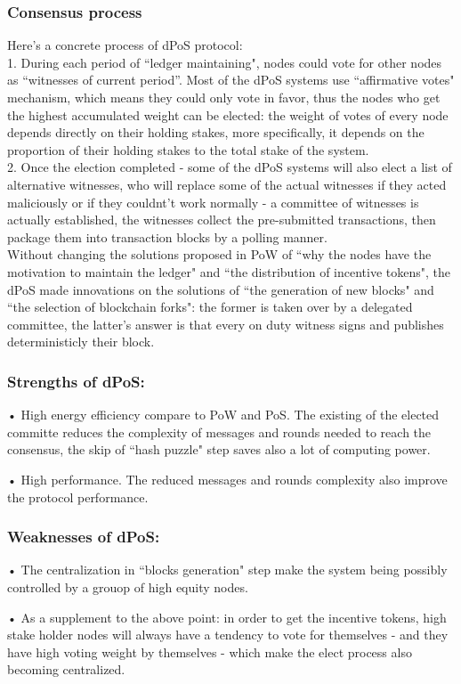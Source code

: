 \documentclass[]{article}
\begin{document}
\begin{CJK*}{UTF8}{gbsn}
 \subsubsection*{Consensus process}
Here's a concrete process of dPoS protocol:
\\1. During each period of ``ledger maintaining", nodes could vote for other nodes as “witnesses of current period”. Most of the dPoS systems use ``affirmative votes" mechanism, which means they could only vote in favor, thus the nodes who get the highest accumulated weight can be elected: the weight of votes of every node depends directly on their holding stakes, more specifically, it depends on the proportion of their holding stakes to the total stake of the system.
\\2. Once the election completed - some of the dPoS systems will also elect a list of alternative witnesses, who will replace some of the actual witnesses if they acted maliciously or if they couldnt't work normally - a committee of witnesses is actually established, the witnesses collect the pre-submitted transactions, then package them into transaction blocks by a polling manner.
\\Without changing the solutions proposed in PoW of ``why the nodes have the motivation to maintain the ledger" and ``the distribution of incentive tokens", the dPoS made innovations on the solutions of ``the generation of new blocks" and ``the selection of blockchain forks": the former is taken over by a delegated committee, the latter's answer is that every on duty witness signs and publishes deterministicly their block.
\subsubsection*{Strengths of dPoS:}	
• High energy efficiency compare to PoW and PoS. The existing of the elected committe reduces the complexity of messages and rounds needed to reach the consensus, the skip of ``hash puzzle" step saves also a lot of computing power.
\par • High performance. The reduced messages and rounds complexity also improve the protocol performance. 
\subsubsection*{Weaknesses of dPoS:}	
• The centralization in ``blocks generation" step make the system being possibly controlled by a grouop of high equity nodes.
\par • As a supplement to the above point: in order to get the incentive tokens, high stake holder nodes will always have a tendency to vote for themselves - and they have high voting weight by themselves - which make the elect process also becoming centralized.
	

\end{CJK*}
\end{document}
